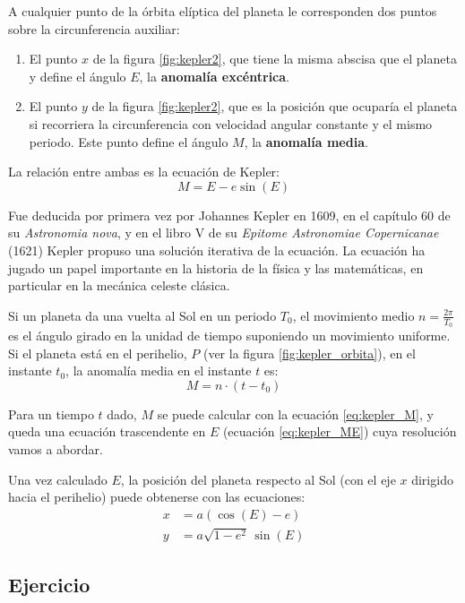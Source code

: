 A cualquier punto de la órbita elíptica del planeta le corresponden dos puntos sobre la circunferencia auxiliar:
\begin{enumerate}
    \item El punto $x$ de la figura \ref{fig:kepler2}, que tiene la misma abscisa que el planeta y define el ángulo $E$, la \textbf{anomalía excéntrica}.
    \item El punto $y$ de la figura \ref{fig:kepler2}, que es la posición que ocuparía el planeta si recorriera la circunferencia con velocidad angular constante y el mismo periodo. Este punto define el ángulo $M$, la \textbf{anomalía media}.
\end{enumerate}

La relación entre ambas es la ecuación de Kepler:
\begin{equation} \label{eq:kepler_ME}
    M=E-e\sin(E)
\end{equation}

Fue deducida por primera vez por Johannes Kepler en 1609, en el capítulo 60 de su \emph{Astronomia nova}, y en el libro V de su \emph{Epitome Astronomiae Copernicanae} (1621) Kepler propuso una solución iterativa de la ecuación. La ecuación ha jugado un papel importante en la historia de la física y las matemáticas, en particular en la mecánica celeste clásica.

Si un planeta da una vuelta al Sol en un periodo $T_0$, el movimiento medio $n=\frac{2\pi}{T_0}$ es el ángulo girado en la unidad de tiempo suponiendo un movimiento uniforme. Si el planeta está en el perihelio, $P$ (ver la figura \ref{fig:kepler_orbita}), en el instante $t_0$, la anomalía media en el instante $t$ es:
\begin{equation} \label{eq:kepler_M}
     M = n \cdot (t -  t_0)
\end{equation}

Para un tiempo $t$ dado, $M$ se puede calcular con la ecuación \ref{eq:kepler_M}, y queda una ecuación trascendente en $E$ (ecuación \ref{eq:kepler_ME}) cuya resolución vamos a abordar.

Una vez calculado $E$, la posición del planeta respecto al Sol (con el eje $x$ dirigido hacia el perihelio) puede obtenerse con las ecuaciones:
\begin{align*}
    x &= a \left(\cos(E)-e\right) \\
    y &= a \sqrt{1-e^2}\, \sin(E)
\end{align*}

\subsection*{Ejercicio}

